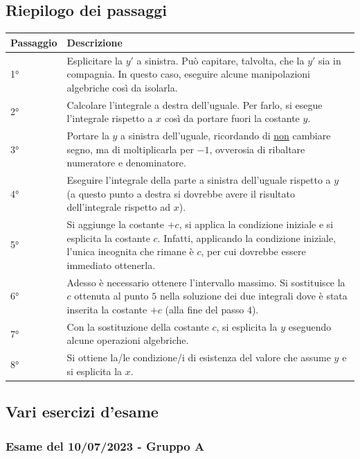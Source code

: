 \documentclass[a4paper]{article}
\begin{document}
	\subsection{Riepilogo dei passaggi}

	\begin{table}[!htp]
		\centering
		\begin{tabular}{@{} l p{23em} @{}}
			\toprule
			\textbf{Passaggio} & \textbf{Descrizione} \\
			\midrule
			1°	& Esplicitare la $y'$ a sinistra. Può capitare, talvolta, che la $y'$ sia in compagnia. In questo caso, eseguire alcune manipolazioni algebriche così da isolarla. \\ [.5em]
			2°	& Calcolare l'integrale a destra dell'uguale. Per farlo, si esegue l'integrale rispetto a $x$ così da portare fuori la costante $y$. \\ [.5em]
			3°	& Portare la $y$ a sinistra dell'uguale, ricordando di \underline{non} cambiare segno, ma di moltiplicarla per $-1$, ovverosia di ribaltare numeratore e denominatore. \\ [.5em]
			4°	& Eseguire l'integrale della parte a sinistra dell'uguale rispetto a $y$ (a questo punto a destra si dovrebbe avere il risultato dell'integrale rispetto ad $x$). \\ [.5em]
			5°	& Si aggiunge la costante $+ c$, si applica la condizione iniziale e si esplicita la costante $c$. Infatti, applicando la condizione iniziale, l'unica incognita che rimane è $c$, per cui dovrebbe essere immediato ottenerla. \\ [.5em]
			6°  & Adesso è necessario ottenere l'intervallo massimo. Si sostituisce la $c$ ottenuta al punto $5$ nella soluzione dei due integrali dove è stata inserita la costante $+ c$ (alla fine del passo $4$). \\ [.5em]
			7°	& Con la sostituzione della costante $c$, si esplicita la $y$ eseguendo alcune operazioni algebriche. \\ [.5em]
			8°  & Si ottiene la/le condizione/i di esistenza del valore che assume $y$ e si esplicita la $x$. \\
			\bottomrule
		\end{tabular}
	\end{table}\newpage

	\subsection{Vari esercizi d'esame}

	\subsubsection{Esame del 10/07/2023 - Gruppo A}
\end{document}
